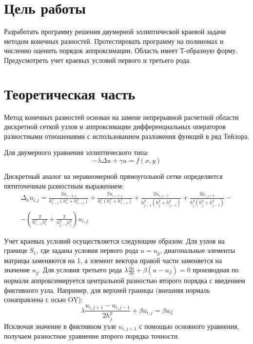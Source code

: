 \documentclass[a4paper,12pt]{article}
\begin{document}
\setcounter{page}{2}

\section{Цель работы}
Разработать программу решения двумерной эллиптической краевой задачи методом конечных разностей. Протестировать программу на полиномах и численно оценить порядок аппроксимации. Область имеет Т-образную форму. Предусмотреть учет краевых условий первого и третьего рода.

\section{Теоретическая часть}
Метод конечных разностей основан на замене непрерывной расчетной области дискретной сеткой узлов и аппроксимации дифференциальных операторов разностными отношениями с использованием разложения функций в ряд Тейлора.

Для двумерного уравнения эллиптического типа:
\begin{equation}
-\lambda \Delta u + \gamma u = f(x, y)
\end{equation}

Дискретный аналог на неравномерной прямоугольной сетке определяется пятиточечным разностным выражением:
\begin{equation}
\begin{split}
\Delta_h u_{i,j} = \frac{2u_{i-1,j}}{h_{i-1}^x(h_i^x+h_{i-1}^x)} + \frac{2u_{i+1,j}}{h_i^x(h_i^x+h_{i-1}^x)} + \frac{2u_{i,j-1}}{h_{j-1}^y(h_j^y+h_{j-1}^y)} + \frac{2u_{i,j+1}}{h_j^y(h_j^y+h_{j-1}^y)} - \\ - \left(\frac{2}{h_{i-1}^x h_i^x} + \frac{2}{h_{j-1}^y h_j^y}\right)u_{i,j}
\end{split}
\end{equation}

Учет краевых условий осуществляется следующим образом:
Для узлов на границе $S_1$, где заданы условия первого рода $u = u_g$, диагональные элементы матрицы заменяются на 1, а элемент вектора правой части заменяется на значение $u_g$.
Для условия третьего рода $\lambda \frac{\partial u}{\partial n} + \beta(u - u_\beta) = 0$ производная по нормали аппроксимируется центральной разностью второго порядка с введением фиктивного узла. Например, для верхней границы (внешняя нормаль сонаправлена с осью OY):
\begin{equation}
\lambda \frac{u_{i,j+1} - u_{i,j-1}}{2h_j^y} + \beta u_{i,j} = \beta u_\beta
\end{equation}
Исключая значение в фиктивном узле $u_{i,j+1}$ с помощью основного уравнения, получаем разностное уравнение второго порядка точности.
\end{document}
